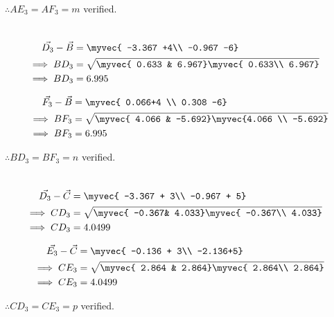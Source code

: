 \documentclass[journal,12pt,twocolumn]{IEEEtran}
\theoremstyle{remark}
\begin{document}
$\therefore {AE_3}= {AF_3}=m $ verified.


\begin{align}
	\\
	\vec{D_3}-\vec B&=\myvec{ -3.367 +4\\ 
                -0.967 -6}\\
\implies	{BD_3}&=\sqrt{\myvec{ 0.633  &
       6.967}
       \myvec{ 0.633\\ 
       6.967}} \\
\implies	{BD_3}&=6.995 
\end{align}






\begin{align}
	\vec{F_3}-\vec B&=\myvec{ 0.066+4 \\
         0.308 -6}\\                              
\implies	{BF_3}&=\sqrt{\myvec{ 4.066 &
       -5.692}
       \myvec{4.066 \\ 
       -5.692}} \\
\implies	{BF_3}&=6.995 
\end{align}           


$\therefore {BD_3}= {BF_3}=n $ verified.






\begin{align}
	\\
	\vec{D_3}-\vec C&=\myvec{ -3.367 + 3\\
       -0.967 + 5}\\
\implies	{CD_3}&=\sqrt{\myvec{ -0.367&
       4.033}
       \myvec{ -0.367\\
       4.033}} \\
\implies	{CD_3}&=4.0499 
\end{align}           







\begin{align}
	\vec{E_3}-\vec C&=\myvec{ -0.136 + 3\\ 
       -2.136+5}\\
\implies	{CE_3}&=\sqrt{\myvec{ 2.864 &
       2.864}
       \myvec{ 2.864\\ 
       2.864}}\\
\implies	{CE_3}&= 4.0499 
\end{align}           


$\therefore {CD_3}= {CE_3}=p $ verified.







\end{document}

